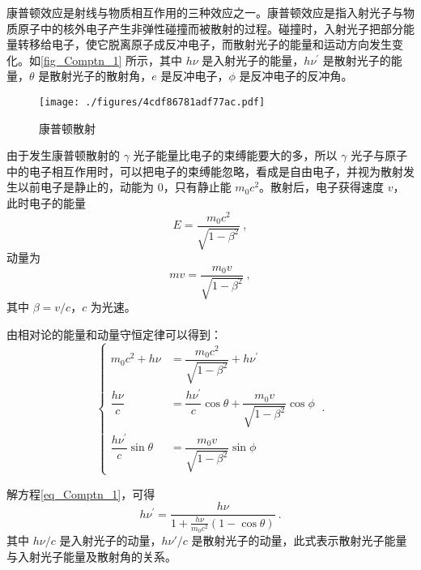 
\begin{issues}
\issueMissDepend
\end{issues}

康普顿效应是射线与物质相互作用的三种效应之一。康普顿效应是指入射光子与物质原子中的核外电子产生非弹性碰撞而被散射的过程。碰撞时，入射光子把部分能量转移给电子，使它脱离原子成反冲电子，而散射光子的能量和运动方向发生变化。如\autoref{fig_Comptn_1} 所示，其中 $h\nu$ 是入射光子的能量，$h\nu^\prime$ 是散射光子的能量，$\theta$ 是散射光子的散射角，$e$ 是反冲电子，$\phi$ 是反冲电子的反冲角。
\begin{figure}[ht]
\centering
\texttt{[image: ./figures/4cdf86781adf77ac.pdf]}
\caption{康普顿散射} \label{fig_Comptn_1}
\end{figure}
由于发生康普顿散射的 $\gamma$ 光子能量比电子的束缚能要大的多，所以 $\gamma$ 光子与原子中的电子相互作用时，可以把电子的束缚能忽略，看成是自由电子，并视为散射发生以前电子是静止的，动能为 $0$，只有静止能 $m_0c^2$。散射后，电子获得速度 $v$，此时电子的能量
\begin{equation}
E=\frac{m_{0} c^{2}}{\sqrt{1-\beta^{2}}}~,
\end{equation}
动量为
\begin{equation}
m v=\frac{m_{0} v}{\sqrt{1-\beta^{2}}}~,
\end{equation}
其中 $\beta=v/c$，$c$ 为光速。

由相对论的能量和动量守恒定律可以得到：
\begin{equation} \label{eq_Comptn_1}
\begin{cases}
m_{0} c^{2}+h \nu&=\dfrac{m_{0} c^{2}}{\sqrt{1-\beta^{2}}}+h \nu^{\prime} \\
\dfrac{h \nu}{c}&=\dfrac{h \nu^{\prime}}{c} \cos \theta+\dfrac{m_{0} v}{\sqrt{1-\beta^{2}}} \cos \phi \\
\dfrac{h \nu^{\prime}}{c} \sin \theta&=\dfrac{m_{0} v}{\sqrt{1-\beta^{2}}} \sin \phi
\end{cases}~.
\end{equation}

解方程\autoref{eq_Comptn_1}，可得
\begin{equation}
h \nu^{\prime}=\frac{h \nu}{1+\frac{h \nu}{m_{0} c^{2}}(1-\cos \theta)}~.
\end{equation}
其中 $h\nu / c$ 是入射光子的动量，$h\nu' / c$ 是散射光子的动量，此式表示散射光子能量与入射光子能量及散射角的关系。